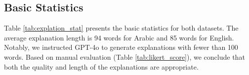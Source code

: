 \subsection{Basic Statistics}
Table \ref{tab:explation_stat} presents the basic statistics for both datasets. The average explanation length is 94 words for Arabic and 85 words for English. Notably, we instructed GPT-4o to generate explanations with fewer than 100 words. Based on manual evaluation (Table \ref{tab:likert_score}), we conclude that both the quality and length of the explanations are appropriate.